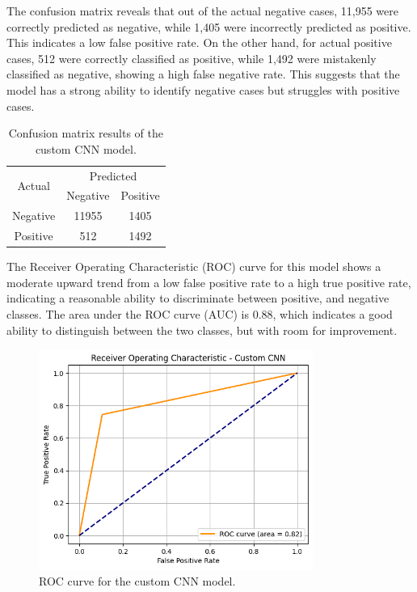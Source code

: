 \documentclass[../main]{subfiles}
\begin{document}
\noindent The confusion matrix reveals that out of the actual negative cases, 11,955 were correctly predicted as negative, while 1,405 were incorrectly predicted as positive. This indicates a low false positive rate. On the other hand, for actual positive cases, 512 were correctly classified as positive, while 1,492 were mistakenly classified as negative, showing a high false negative rate. This suggests that the model has a strong ability to identify negative cases but struggles with positive cases.

\begin{table}[h]
    \centering
    \begin{tabular}{|c|c|c|}
        \hline
        \multirow{2}{*}{Actual} & \multicolumn{2}{c|}{Predicted} \\ \cline{2-3}
                                & Negative         & Positive         \\ \hline
        Negative                & 11955            & 1405              \\ \hline
        Positive                & 512              & 1492              \\ \hline
    \end{tabular}
    \caption{Confusion matrix results of the custom CNN model.}
    \label{tab:confusion-matrix-custom-cnn}
\end{table}

\noindent The Receiver Operating Characteristic (ROC) curve for this model shows a moderate upward trend from a low false positive rate to a high true positive rate, indicating a reasonable ability to discriminate between positive, and negative classes. The area under the ROC curve (AUC) is 0.88, which indicates a good ability to distinguish between the two classes, but with room for improvement.

\begin{figure}[h]
	\centering
	\includegraphics[width=0.8\textwidth]{assets/roc_custom_cnn.png}
	\caption{ROC curve for the custom CNN model.}
    \label{fig:roc-custom-cnn}
\end{figure}
\end{document}
